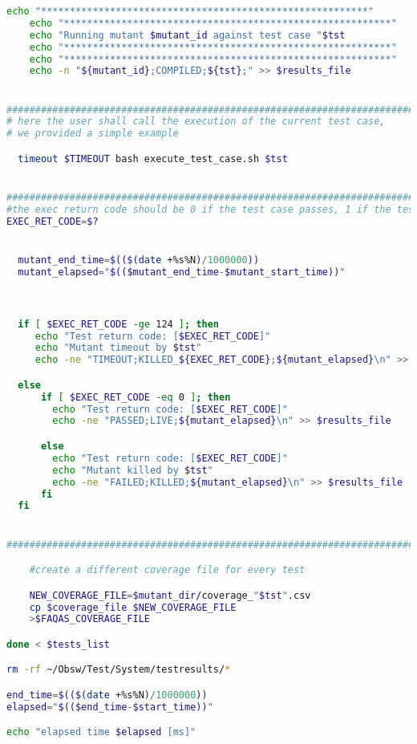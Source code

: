 \begin{lstlisting}[label={lst:run_tests},language=bash]
    echo "*********************************************************"
    echo "*********************************************************"
    echo "Running mutant $mutant_id against test case "$tst
    echo "*********************************************************"
    echo "*********************************************************"
    echo -n "${mutant_id};COMPILED;${tst};" >> $results_file


###############################################################################
# here the user shall call the execution of the current test case,
# we provided a simple example

  timeout $TIMEOUT bash execute_test_case.sh $tst


###############################################################################
#the exec return code should be 0 if the test case passes, 1 if the test case fails and 124 in case of a timeout
EXEC_RET_CODE=$?


  mutant_end_time=$(($(date +%s%N)/1000000))
  mutant_elapsed="$(($mutant_end_time-$mutant_start_time))"



  if [ $EXEC_RET_CODE -ge 124 ]; then
     echo "Test return code: [$EXEC_RET_CODE]"
     echo "Mutant timeout by $tst"
     echo -ne "TIMEOUT;KILLED_${EXEC_RET_CODE};${mutant_elapsed}\n" >> $results_file

  else
      if [ $EXEC_RET_CODE -eq 0 ]; then
        echo "Test return code: [$EXEC_RET_CODE]"
        echo -ne "PASSED;LIVE;${mutant_elapsed}\n" >> $results_file

      else
        echo "Test return code: [$EXEC_RET_CODE]"
        echo "Mutant killed by $tst"
        echo -ne "FAILED;KILLED;${mutant_elapsed}\n" >> $results_file
      fi
  fi


###############################################################################

	#create a different coverage file for every test

	NEW_COVERAGE_FILE=$mutant_dir/coverage_"$tst".csv
	cp $coverage_file $NEW_COVERAGE_FILE
	>$FAQAS_COVERAGE_FILE

done < $tests_list

rm -rf ~/Obsw/Test/System/testresults/*

end_time=$(($(date +%s%N)/1000000))
elapsed="$(($end_time-$start_time))"

echo "elapsed time $elapsed [ms]"


\end{lstlisting}

